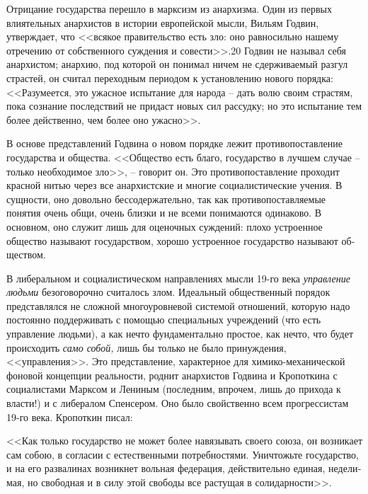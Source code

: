 \documentclass{book}
\begin{document}
Отрицание государства перешло в марксизм из анархизма. Один из первых влиятельных анархистов в истории европей­ской мысли, Вильям Годвин, утверждает, что <<всякое правительство есть зло: оно равносильно нашему отречению от соб­ственного суждения и совести>>.20 Годвин не называл себя анархистом; анархию, под которой он понимал ничем не сдер­живаемый разгул страстей, он считал переходным периодом к установлению нового порядка: <<Разумеется, это ужасное испытание для народа -- дать волю своим страстям, пока со­знание последствий не придаст новых сил рассудку; но это ис­пытание тем более действенно, чем более оно ужасно>>.%

В основе представлений Годвина о новом порядке лежит противопоставление государства и общества. <<Общество есть благо, государство в лучшем случае -- только необходимое зло>>, -- говорит он. Это противопоставление проходит крас­ной нитью через все анархистские и многие социалистические учения. В сущности, оно довольно бессодержательно, так как противопоставляемые понятия очень общи, очень близки и не всеми понимаются одинаково. В основном, оно служит лишь для оценочных суждений: плохо устроенное общество называют государством, хорошо устроенное государство называют об­ществом.

В либеральном и социалистическом направлениях мысли 19-го века \textit{управление людьми}  безоговорочно считалось злом. Идеальный общественный порядок представлялся не сложной многоуровневой системой отношений, которую надо постоян­но поддерживать с помощью специальных учреждений (что есть управление людьми), а как нечто фундаментально простое, как нечто, что будет происходить \textit{само собой,}  лишь бы только не было принуждения, <<управления>>. Это представление, харак­терное для химико-механической фоновой концепции реаль­ности, роднит анархистов Годвина и Кропоткина с социалиста­ми Марксом и Лениным (последним, впрочем, лишь до при­хода к власти!) и с либералом Спенсером. Оно было свойственно всем прогрессистам 19-го века.
Кропоткин писал:

<<Как только государство не может более навязывать свое­го союза, он возникает сам 
собою, в согласии с естественными потребностями. Уничтожьте государство, и на его 
развалинах возникнет вольная федерация, действительно единая, недели­мая, но свободная 
и в силу этой свободы все растущая в солидарности>>.%
\end{document}
